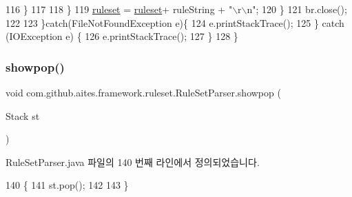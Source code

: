 \begin{DoxyCode}
116                     \}
117                     
118                 \}
119                 \mbox{\hyperlink{classcom_1_1github_1_1aites_1_1framework_1_1ruleset_1_1_rule_set_parser_a3426342e8e47a6a3e2a7588707908266}{ruleset}} = \mbox{\hyperlink{classcom_1_1github_1_1aites_1_1framework_1_1ruleset_1_1_rule_set_parser_a3426342e8e47a6a3e2a7588707908266}{ruleset}}+ ruleString + \textcolor{stringliteral}{"\(\backslash\)r\(\backslash\)n"};                       
120             \}
121             br.close();
122         
123         \}\textcolor{keywordflow}{catch}(FileNotFoundException e)\{
124             e.printStackTrace();
125         \} \textcolor{keywordflow}{catch} (IOException e) \{
126             e.printStackTrace();
127         \}    
128     \}
\end{DoxyCode}
\mbox{\label{classcom_1_1github_1_1aites_1_1framework_1_1ruleset_1_1_rule_set_parser_af965729964803bdb5e9b2240fea46f44}} 
\subsubsection{\texorpdfstring{showpop()}{showpop()}}
{\footnotesize\ttfamily void com.\+github.\+aites.\+framework.\+ruleset.\+Rule\+Set\+Parser.\+showpop (\begin{DoxyParamCaption}\item[{Stack}]{st }\end{DoxyParamCaption})\hspace{0.3cm}{\ttfamily [private]}}



Rule\+Set\+Parser.\+java 파일의 140 번째 라인에서 정의되었습니다.


\begin{DoxyCode}
140                                   \{
141         st.pop();       
142     
143     \}
\end{DoxyCode}
\mbox{\label{classcom_1_1github_1_1aites_1_1framework_1_1ruleset_1_1_rule_set_parser_a81d054f35b4d13482daa2de19fc8a4c6}} 
